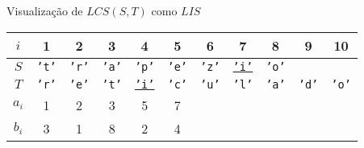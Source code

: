 \begin{frame}[fragile]{Visualização de $LCS(S, T)$ como $LIS$}

    \begin{table}
        \centering

        \begin{tabular}{c|cccccccccc} 
        \hline 
        $i$ & 1 & 2 & 3 & 4 & 5 & 6 & 7 & 8 & 9 & 10\\
        \hline
        $S$
        & {\textcolor{blue!80!black}{\texttt{'t'}}}
        & {\textcolor{blue!80!black}{\texttt{'r'}}}
        & {\textcolor{blue!80!black}{\texttt{'a'}}}
        & \textcolor{blue!80!black}{\texttt{'p'}}
        & {\textcolor{blue!80!black}{\texttt{'e'}}}
        & \textcolor{blue!80!black}{\texttt{'z'}}
        & \underline{\textcolor{blue!80!black}{\texttt{'i'}}}
        & \textcolor{blue!80!black}{\texttt{'o'}} \\
        $T$
        & {\textcolor{green!50!black}{\texttt{'r'}}}
        & {\textcolor{green!50!black}{\texttt{'e'}}}
        & \textcolor{green!50!black}{\texttt{'t'}}
        & \underline{\textcolor{green!50!black}{\texttt{'i'}}}
        & \textcolor{green!50!black}{\texttt{'c'}}
        & \textcolor{green!50!black}{\texttt{'u'}}
        & \textcolor{green!50!black}{\texttt{'l'}}
        & {\textcolor{green!50!black}{\texttt{'a'}}}
        & \textcolor{green!50!black}{\texttt{'d'}}
        & \textcolor{green!50!black}{\texttt{'o'}} \\
        $a_i$ & 1 & 2 & 3 & 5 & 7\\
        $b_i$ & 3 & 1 & 8 & 2 & 4\\
        \hline
        \end{tabular}

    \end{table}

\end{frame}

